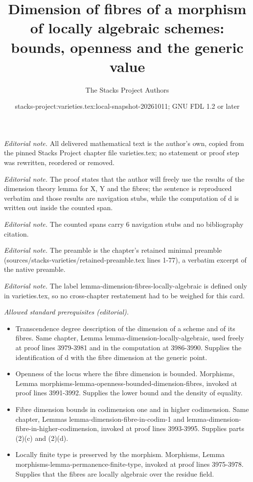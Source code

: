 \documentclass[10pt,a4paper]{amsart}
\title{Dimension of fibres of a morphism of locally algebraic schemes: bounds, openness and the generic value}
\author{The Stacks Project Authors}
\date{stacks-project:varieties.tex:local-snapshot-20261011; GNU FDL 1.2 or later}
\theoremstyle{plain}
\theoremstyle{definition}
\theoremstyle{remark}
\numberwithin{equation}{subsection}
\begin{document}
\maketitle
\noindent\textit{Editorial note.} All delivered mathematical text is the author's own, copied from the pinned Stacks Project chapter file varieties.tex; no statement or proof step was rewritten, reordered or removed.\par\medskip
\noindent\textit{Editorial note.} The proof states that the author will freely use the results of the dimension theory lemma for X, Y and the fibres; the sentence is reproduced verbatim and those results are navigation stubs, while the computation of d is written out inside the counted span.\par\medskip
\noindent\textit{Editorial note.} The counted spans carry 6 navigation stubs and no bibliography citation.\par\medskip
\noindent\textit{Editorial note.} The preamble is the chapter's retained minimal preamble (sources/stacks-varieties/retained-preamble.tex lines 1-77), a verbatim excerpt of the native preamble.\par\medskip
\noindent\textit{Editorial note.} The label lemma-dimension-fibres-locally-algebraic is defined only in varieties.tex, so no cross-chapter restatement had to be weighed for this card.\par\medskip
\noindent\textit{Allowed standard prerequisites (editorial).}\begin{itemize}
\item Transcendence degree description of the dimension of a scheme and of its fibres. Same chapter, Lemma lemma-dimension-locally-algebraic, used freely at proof lines 3979-3981 and in the computation at 3986-3990. Supplies the identification of d with the fibre dimension at the generic point.
\item Openness of the locus where the fibre dimension is bounded. Morphisms, Lemma morphisms-lemma-openness-bounded-dimension-fibres, invoked at proof lines 3991-3992. Supplies the lower bound and the density of equality.
\item Fibre dimension bounds in codimension one and in higher codimension. Same chapter, Lemmas lemma-dimension-fibre-in-codim-1 and lemma-dimension-fibre-in-higher-codimension, invoked at proof lines 3993-3995. Supplies parts (2)(c) and (2)(d).
\item Locally finite type is preserved by the morphism. Morphisms, Lemma morphisms-lemma-permanence-finite-type, invoked at proof lines 3975-3978. Supplies that the fibres are locally algebraic over the residue field.
\end{itemize}\medskip
\end{document}
